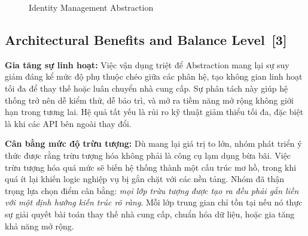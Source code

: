 \documentclass[12pt, a4paper]{article}
\begin{document}
\vspace{-0.2cm}
\begin{figure}[H]
    \centering
    \caption{Identity Management Abstraction}
\end{figure}

\subsection[Architectural Benefits and Balance Level]{Architectural Benefits and Balance Level \,{\normalfont\small\textcolor{cyan!70!black}{[3]}}}

\noindent\textbf{Gia tăng sự linh hoạt:} Việc vận dụng triệt để Abstraction mang lại sự suy giảm đáng kể mức độ phụ thuộc chéo giữa các phân hệ, tạo không gian linh hoạt tối đa để thay thế hoặc luân chuyển nhà cung cấp. Sự phân tách này giúp hệ thống trở nên dễ kiểm thử, dễ bảo trì, và mở ra tiềm năng mở rộng không giới hạn trong tương lai. Hệ quả tất yếu là rủi ro kỹ thuật giảm thiểu tối đa, đặc biệt là khi các API bên ngoài thay đổi.

\vspace{0.15cm}
\noindent\textbf{Cân bằng mức độ trừu tượng:} Dù mang lại giá trị to lớn, nhóm phát triển ý thức được rằng trừu tượng hóa không phải là công cụ lạm dụng bừa bãi. Việc trừu tượng hóa quá mức sẽ biến hệ thống thành một cấu trúc mơ hồ, trong khi quá ít lại khiến logic nghiệp vụ bị gắn chặt với các nền tảng. Nhóm đã thận trọng lựa chọn điểm cân bằng: \textit{mọi lớp trừu tượng được tạo ra đều phải gắn liền với một định hướng kiến trúc rõ ràng}. Mỗi lớp trung gian chỉ tồn tại nếu nó thực sự giải quyết bài toán thay thế nhà cung cấp, chuẩn hóa dữ liệu, hoặc gia tăng khả năng mở rộng.
\end{document}
